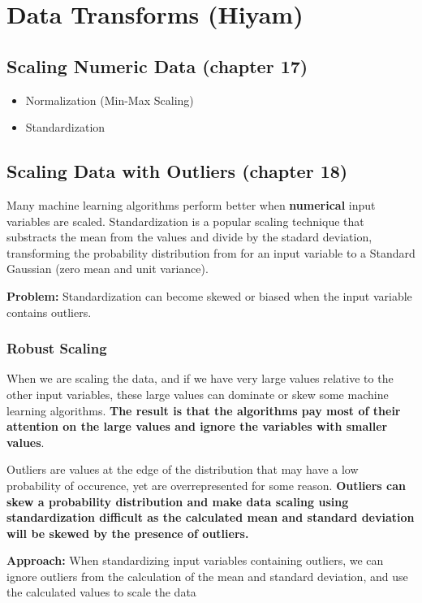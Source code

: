 \documentclass{article}
\begin{document}
\section{Data Transforms (Hiyam)}
\subsection{Scaling Numeric Data (chapter 17)}
\begin{itemize}
\item Normalization (Min-Max Scaling)
\item Standardization
\end{itemize}

\subsection{Scaling Data with Outliers (chapter 18)}
Many machine learning algorithms perform better when \textbf{numerical} input variables are scaled. Standardization is a popular scaling technique that substracts the mean from the values and divide by the stadard deviation, transforming the probability distribution from for an input variable to a Standard Gaussian (zero mean and unit variance).

\noindent \textbf{Problem:} Standardization can become skewed or biased when the input variable contains outliers.

\subsubsection*{Robust Scaling}
When we are scaling the data, and if we have very large values relative to the other input variables, these large values can dominate or skew some machine learning algorithms. \textbf{The result is that the algorithms pay most of their attention on the large values and ignore the variables with smaller values}.

\noindent Outliers are values at the edge of the distribution that may have a low probability of occurence, yet are overrepresented for some reason. \textbf{Outliers can skew a probability distribution and make data scaling using standardization difficult as the calculated mean and standard deviation will be skewed by the presence of outliers.}

\noindent \textbf{Approach:} When standardizing input variables containing outliers, we can ignore outliers from the calculation of the mean and standard deviation, and use the calculated values to scale the data
\end{document}
